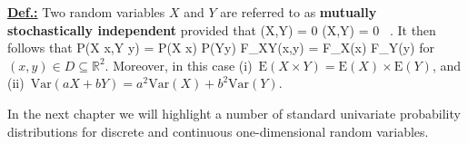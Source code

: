 \medskip
\noindent
\underline{\textbf{Def.:}} Two random variables $X$ and $Y$ are 
referred to as \textbf{mutually stochastically independent}
provided that
%
\be
{}
(X,Y) = 0
\qquad\Leftrightarrow\qquad
\rho(X,Y) = 0 \ .
\ee
%
It then follows that
%
\be
{}
P(X \leq x,Y \leq y) = P(X \leq x) \times P(Y\leq y)
\quad\Leftrightarrow\quad
F_{XY}(x,y) = F_{X}(x) \times F_{Y}(y)
\ee
%
for $(x,y) \in D \subseteq \mathbb{R}^{2}$. Moreover, in this case 
(i)~$\mathrm{E}(X \times Y) = \mathrm{E}(X) \times \mathrm{E}(Y)$,
and (ii)~$\mathrm{Var}(aX+bY) = a^{2}\mathrm{Var}(X)+b^{2}
\mathrm{Var}(Y)$.

\vspace{5mm}
\noindent
In the next chapter we will highlight a number of standard 
univariate probability distributions for discrete and continuous 
one-dimensional random variables.

